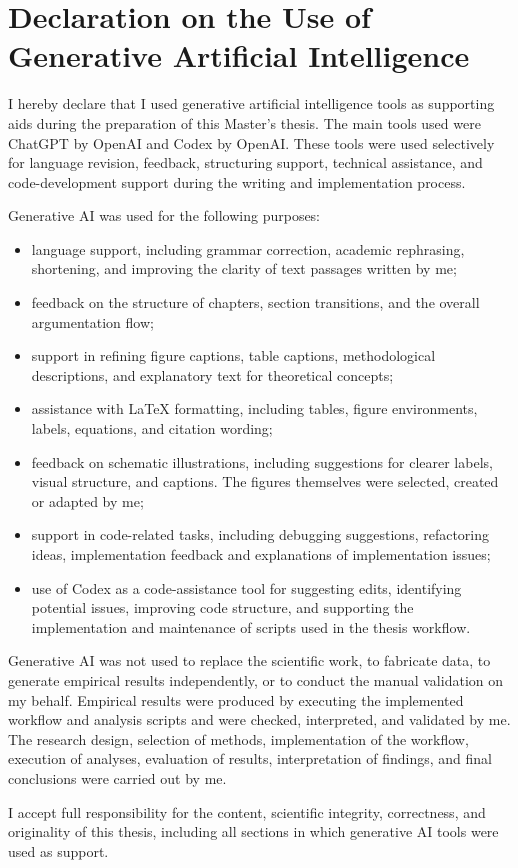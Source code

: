 \chapter*{Declaration on the Use of Generative Artificial Intelligence}
\thispagestyle{rmplain}
\label{02_ai_declaration}

I hereby declare that I used generative artificial intelligence tools as supporting aids during the preparation of this Master's thesis. The main tools used were ChatGPT by OpenAI and Codex by OpenAI. These tools were used selectively for language revision, feedback, structuring support, technical assistance, and code-development support during the writing and implementation process.

Generative AI was used for the following purposes:

\begin{itemize}
    \item language support, including grammar correction, academic rephrasing, shortening, and improving the clarity of text passages written by me;
    \item feedback on the structure of chapters, section transitions, and the overall argumentation flow;
    \item support in refining figure captions, table captions, methodological descriptions, and explanatory text for theoretical concepts;
    \item assistance with LaTeX formatting, including tables, figure environments, labels, equations, and citation wording;
    \item feedback on schematic illustrations, including suggestions for clearer labels, visual structure, and captions. The figures themselves were selected, created or adapted by me;
    \item support in code-related tasks, including debugging suggestions, refactoring ideas, implementation feedback and explanations of implementation issues;
    \item use of Codex as a code-assistance tool for suggesting edits, identifying potential issues, improving code structure, and supporting the implementation and maintenance of scripts used in the thesis workflow.
\end{itemize}

Generative AI was not used to replace the scientific work, to fabricate data, to generate empirical results independently, or to conduct the manual validation on my behalf. Empirical results were produced by executing the implemented workflow and analysis scripts and were checked, interpreted, and validated by me. The research design, selection of methods, implementation of the workflow, execution of analyses, evaluation of results, interpretation of findings, and final conclusions were carried out by me.

I accept full responsibility for the content, scientific integrity, correctness, and originality of this thesis, including all sections in which generative AI tools were used as support.

\vspace{1.5cm}

